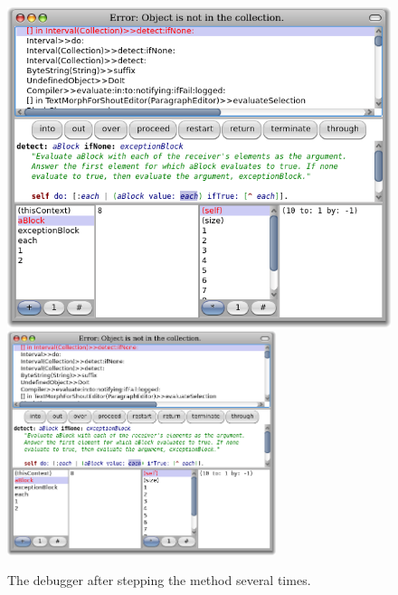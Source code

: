 \documentclass[a4paper,10pt,twoside]{book}
\begin{document}
\begin{figure}[btp]
	\begin{center}
	\ifluluelse
		{\includegraphics[width=\textwidth]{steppingIntoValue}}
		{\includegraphics[width=0.7\textwidth]{steppingIntoValue}}
	\end{center}
	\caption{The debugger after stepping  the  method several times.
	}
\end{figure}

\end{document}
